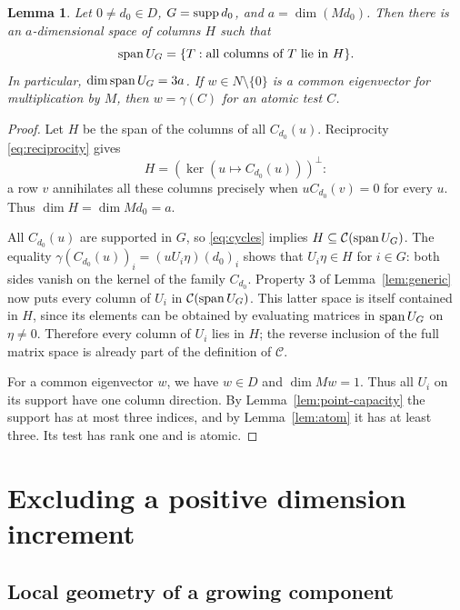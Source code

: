 \documentclass[11pt,a4paper]{article}
\numberwithin{equation}{section}
\theoremstyle{plain}
\newtheorem{lemma}[theorem]{Lemma}
\theoremstyle{definition}
\newcommand{\col}{\mathcal C}\newcommand{\test}{\mathcal T}
\begin{document}
\begin{lemma}\label{lem:stationary}
Let $0\ne d_0\in D$, $G=\operatorname{supp} d_0$, and $a=\dim(Md_0)$.
Then there is an $a$-dimensional space of columns $H$ such that
\[
 \operatorname{span} U_G=\{T:\text{all columns of }T\text{ lie in }H\}.
\]
In particular, $\dim\operatorname{span} U_G=3a$.
If $w\in N\setminus\{0\}$ is a common eigenvector for multiplication
by $M$, then $w=\gamma(C)$ for an atomic test $C$.
\end{lemma}
\begin{proof}
Let $H$ be the span of the columns of all $C_{d_0}(u)$.
Reciprocity \eqref{eq:reciprocity} gives
\[
 H=(\ker(u\mapsto C_{d_0}(u)))^\perp:
\]
a row $v$ annihilates all
these columns precisely when $uC_{d_0}(v)=0$ for every $u$.
Thus $\dim H=\dim Md_0=a$.

All $C_{d_0}(u)$ are supported in $G$, so \eqref{eq:cycles} implies
$H\subseteq\col(\Span U_G)$. The equality
$\gamma(C_{d_0}(u))_i=(uU_i\eta)(d_0)_i$ shows that $U_i\eta\in H$
for $i\in G$: both sides vanish on the kernel of the family $C_{d_0}$.
Property 3 of Lemma~\ref{lem:generic} now puts every column of $U_i$
in $\col(\Span U_G)$. This latter space is itself contained in $H$,
since its elements can be obtained by evaluating matrices in
$\operatorname{span} U_G$ on $\eta\ne0$. Therefore every column of $U_i$ lies in $H$;
the reverse inclusion of the full matrix space is already part of
the definition of $\col$.

For a common eigenvector $w$, we have $w\in D$ and $\dim Mw=1$.
Thus all $U_i$ on its support have one column direction.
By Lemma~\ref{lem:point-capacity} the support has at most three
indices, and by Lemma~\ref{lem:atom} it has at least three.
Its test has rank one and is atomic.
\end{proof}

\section{Excluding a positive dimension increment}

\subsection{Local geometry of a growing component}
\end{document}
